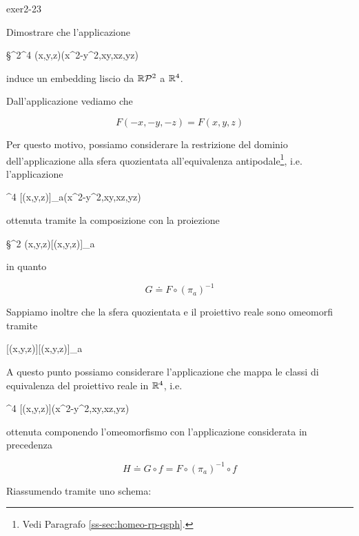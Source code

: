 
{exer2-23}
{
Dimostrare che l'applicazione

	{\S^{2}}{\R^{4}}
	{(x,y,z)}{(x^{2}-y^{2},xy,xz,yz)}

induce un embedding liscio da $ \mathbb{R}\mathcal{P}^{2} $ a $ \mathbb{R}^{4} $.
}
{
Dall'applicazione vediamo che

\begin{equation}
	F(-x,-y,-z) = F(x,y,z)
\end{equation}

Per questo motivo, possiamo considerare la restrizione del dominio dell'applicazione alla sfera quozientata all'equivalenza antipodale\footnote{%
	Vedi Paragrafo \ref{ss-sec:homeo-rp-qsph}.%
}, i.e. l'applicazione

	{}{\R^{4}}
	{[(x,y,z)]_{a}}{(x^{2}-y^{2},xy,xz,yz)}

ottenuta tramite la composizione con la proiezione

	{\S^{2}}{}
	{(x,y,z)}{[(x,y,z)]_{a}}

in quanto

\begin{equation}
	G \doteq F \circ (\pi_{a})^{-1}
\end{equation}

Sappiamo inoltre che la sfera quozientata e il proiettivo reale sono omeomorfi tramite

	{}{}
	{[(x,y,z)]}{[(x,y,z)]_{a}}

A questo punto possiamo considerare l'applicazione che mappa le classi di equivalenza del proiettivo reale in $ \mathbb{R}^{4} $, i.e.

	{}{\R^{4}}
	{[(x,y,z)]}{(x^{2}-y^{2},xy,xz,yz)}

ottenuta componendo l'omeomorfismo con l'applicazione considerata in precedenza

\begin{equation}
	H \doteq G \circ f = F \circ (\pi_{a})^{-1} \circ f
\end{equation}

Riassumendo tramite uno schema:


}
